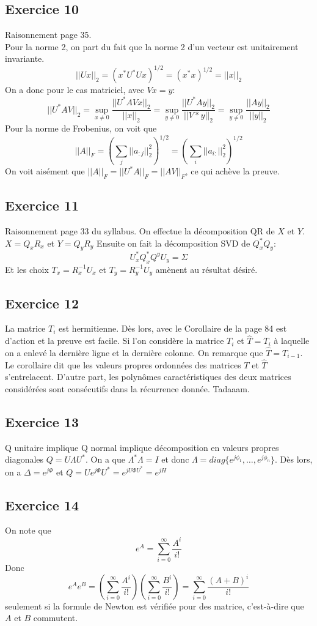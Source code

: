 \subsection*{Exercice 10}
Raisonnement page 35.\\
Pour la norme 2, on part du fait que la norme 2 d'un vecteur est unitairement invariante.
$$ ||Ux||_2 = (x^*U^*Ux)^{1/2} = (x^*x)^{1/2} = ||x||_2$$
On a donc pour le cas matriciel, avec $Vx = y$:
$$
||U^*AV||_2 = \sup_{x\neq 0}\frac{||U^*AVx||_2}{||x||_2} = \sup_{y\neq 0}\frac{||U^*Ay||_2}{||V*y||_2} = \sup_{y\neq 0}\frac{||Ay||_2}{||y||_2}$$
Pour la norme de Frobenius, on voit que
$$ ||A||_F = \left(\sum_j ||a_{:j}||^2_2\right)^{1/2} = \left(\sum_i ||a_{i:}||^2_2\right)^{1/2}$$
On voit aisément que $||A||_F = ||U^*A||_F = ||AV||_F$, ce qui achève la preuve.

\subsection*{Exercice 11}
Raisonnement page 33 du syllabus. On effectue la décomposition QR de $X$ et $Y$. $X = Q_xR_x$ et $Y = Q_y R_y$ Ensuite on fait la décomposition SVD de $Q_x^* Q_y$:
$$ U_x^* Q_x^* Q^y U_y = \Sigma$$
Et les choix $T_x = R_x^{-1}U_x$ et $T_y = R_y^{-1}U_y$ amènent au résultat désiré.

\subsection*{Exercice 12}

La matrice $T_i$ est hermitienne. Dès lors, avec le Corollaire de la page 84 est d'action et la preuve est facile. Si l'on considère la matrice $T_i$ et $\hat{T}=T_i$ à laquelle on a enlevé la dernière ligne et la dernière colonne. On remarque que $\hat{T} = T_{i-1}$. Le corollaire dit que les valeurs propres ordonnées des matrices $T$ et $\hat{T}$ s'entrelacent. D'autre part, les polynômes caractéristiques des deux matrices considérées sont consécutifs dans la récurrence donnée. Tadaaam.
\subsection*{Exercice 13}
Q unitaire implique Q normal implique décomposition en valeurs propres diagonales $Q = U\Lambda U^*$. On a que $\Lambda^*\Lambda = I$ et donc $\Lambda = diag\{e^{j\phi_1},\dots,e^{j\phi_n}\}$. Dès lors, on a $\Delta = e^{j\Phi}$ et $Q = Ue^{j\Phi}U^* = e^{jU\Phi U^*} = e^{jH}$
\subsection*{Exercice 14}
On note que
$$ e^A = \sum_{i=0}^{\infty} \frac{A^i}{i!}$$
Donc
$$ e^A e^B = \left(\sum_{i=0}^{\infty} \frac{A^i}{i!}\right)\left(\sum_{i=0}^{\infty} \frac{B^i}{i!}\right) = \sum_{i=0}^{\infty} \frac{(A+B)^i}{i!}$$ seulement si la formule de Newton est vérifiée pour des matrice, c'est-à-dire que $A$ et $B$ commutent.
